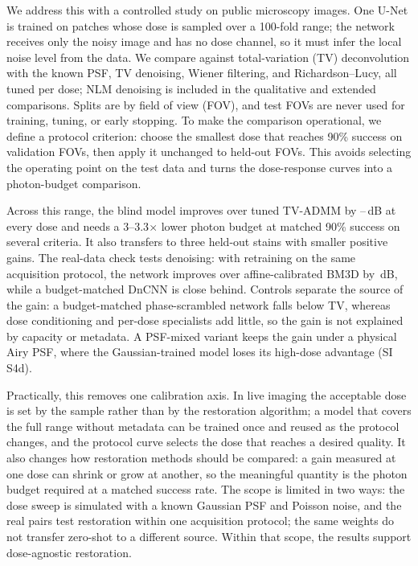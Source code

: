 \documentclass[preprint,12pt]{elsarticle}
\begin{document}
We address this with a controlled study on public microscopy images. One U-Net
is trained on patches whose dose is sampled over a 100-fold range; the network
receives only the noisy image and has no dose channel, so it must infer the
local noise level from the data. We compare against total-variation (TV)
deconvolution with the known PSF, TV denoising, Wiener filtering, and
Richardson--Lucy, all tuned per dose; NLM denoising is included in the
qualitative and extended comparisons. Splits are by field of view (FOV), and
test FOVs are never used for training, tuning, or early stopping. To make the
comparison operational, we define a protocol criterion: choose the smallest
dose that reaches 90\% success on validation FOVs, then apply it unchanged to
held-out FOVs. This avoids selecting the operating point on the test data and
turns the dose-response curves into a photon-budget comparison.

Across this range, the blind model improves over tuned TV-ADMM by
\BestGainMin--\BestGainMax\,dB at every dose and needs a 3--3.3$\times$ lower
photon budget at matched 90\% success on several criteria. It also transfers to
three held-out stains with smaller positive gains. The real-data check tests
denoising: with retraining on the same acquisition protocol, the network
improves over affine-calibrated BM3D by \RealGain\,dB, while a budget-matched
DnCNN is close behind. Controls separate the source of the gain: a
budget-matched phase-scrambled network falls below TV, whereas dose
conditioning and per-dose specialists add little, so the gain is not explained
by capacity or metadata. A PSF-mixed variant keeps the gain under a physical Airy PSF,
where the Gaussian-trained model loses its high-dose advantage (SI S4d).

Practically, this removes one calibration axis. In live imaging the acceptable
dose is set by the sample rather than by the restoration algorithm; a model
that covers the full range without metadata can be trained once and reused as
the protocol changes, and the protocol curve selects the dose that reaches a
desired quality. It also changes how restoration methods should be compared: a
gain measured at one dose can shrink or grow at another, so the meaningful
quantity is the photon budget required at a matched success rate. The scope is limited in two ways: the dose sweep is simulated with a
known Gaussian PSF and Poisson noise, and the real pairs test restoration
within one acquisition protocol; the same weights do not transfer zero-shot to
a different source. Within that scope, the results support dose-agnostic
restoration.
\end{document}

